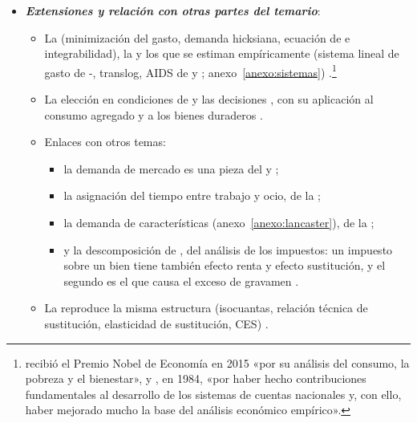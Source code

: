 \documentclass[11pt]{article}
\begin{document}
\begin{itemize}
\item \textbf{\emph{Extensiones y relación con otras partes del temario}}:
  \begin{itemize}
  \item La  (minimización del gasto, demanda hicksiana, ecuación de  e integrabilidad), la  y los  que se estiman empíricamente (sistema lineal de gasto de -, translog, AIDS de  y ; anexo~\ref{anexo:sistemas}) .\footnote{ recibió el Premio Nobel de Economía en 2015 «por su análisis del consumo, la pobreza y el bienestar»\nocite{Nobel2015Deaton}, y , en 1984, «por haber hecho contribuciones fundamentales al desarrollo de los sistemas de cuentas nacionales y, con ello, haber mejorado mucho la base del análisis económico empírico»\nocite{Nobel1984Stone}.}
  \item La elección en condiciones de   y las decisiones  , con su aplicación al consumo agregado y a los bienes duraderos .
  \item Enlaces con otros temas:
    \begin{itemize}
    \item la demanda de mercado es una pieza del   y  ;
    \item la asignación del tiempo entre trabajo y ocio, de la  ;
    \item la demanda de características (anexo~\ref{anexo:lancaster}), de la  ;
    \item y la descomposición de , del análisis de los impuestos: un impuesto sobre un bien tiene también efecto renta y efecto sustitución, y el segundo es el que causa el exceso de gravamen .
    \end{itemize}
  \item La  reproduce la misma estructura (isocuantas, relación técnica de sustitución, elasticidad de sustitución, CES) .
  \end{itemize}


\end{itemize}
\end{document}
